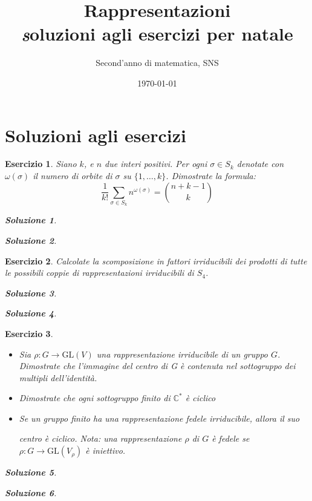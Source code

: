 \documentclass[a4paper]{article}
\title{Rappresentazioni \\ { \textit soluzioni agli esercizi per natale }}
\author{Second'anno di matematica, SNS}
\date{\today}
\theoremstyle{break}
\newtheorem{ex}{{ \Large Esercizio} }
\theoremstyle{plain}
\newtheorem{sol}{Soluzione}[ex]
\begin{document}
\maketitle

\section*{Soluzioni agli esercizi}

\begin{ex} 
Siano $k$, e $n$ due interi positivi. Per ogni $\sigma \in S_k$ denotate con $\omega(\sigma)$ il numero di orbite di $\sigma$ su $\{1, \ldots, k\}$. Dimostrate la formula:
$$ \frac{1}{k!} \sum_{\sigma \in S_k} n^{\omega(\sigma)} = \binom{n+k-1}{k} $$

\begin{sol} 

\end{sol}

\begin{sol}

\end{sol}


\end{ex}

\begin{ex}
Calcolate la scomposizione in fattori irriducibili dei prodotti di tutte le possibili coppie di rappresentazioni irriducibili di $S_4$.

\begin{sol}

\end{sol}

\begin{sol}

\end{sol}


\end{ex}

\begin{ex}

\begin{itemize}
\item[(a)]  Sia $\rho: G \to \mathrm{GL}(V) $ una rappresentazione irriducibile di un gruppo $G$. Dimostrate che l’immagine del centro di G è contenuta nel sottogruppo dei multipli dell’identità.

\item[(b)] Dimostrate che ogni sottogruppo finito di $\mathbb{C}^*$ è ciclico

\item[(c)] Se un gruppo finito ha una rappresentazione fedele irriducibile, allora il suo

centro è ciclico. Nota: una rappresentazione $\rho$ di $G$ è fedele se $\rho: G \to \mathrm{GL}(V_{\rho}) $ è iniettivo.

\end{itemize}
\begin{sol}

\end{sol}

\begin{sol}

\end{sol}


\end{ex}
\end{document}
